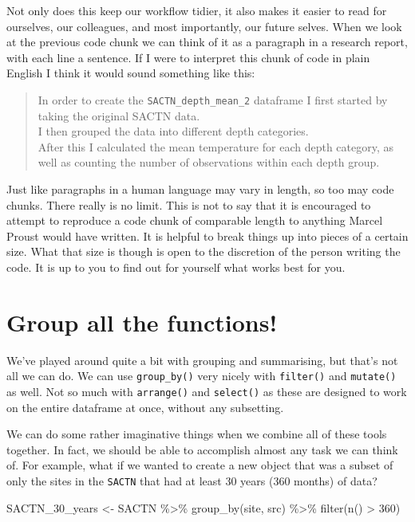 \documentclass[
]{book}
\newenvironment{Shaded}{\begin{snugshade}}{\end{snugshade}}
\newcommand{\DecValTok}[1]{\textcolor[rgb]{0.00,0.00,0.81}{#1}}
\newcommand{\FunctionTok}[1]{\textcolor[rgb]{0.00,0.00,0.00}{#1}}
\newcommand{\NormalTok}[1]{#1}
\newcommand{\OtherTok}[1]{\textcolor[rgb]{0.56,0.35,0.01}{#1}}
\newcommand{\SpecialCharTok}[1]{\textcolor[rgb]{0.00,0.00,0.00}{#1}}
\begin{document}
Not only does this keep our workflow tidier, it also makes it easier to read for ourselves, our colleagues, and most importantly, our future selves. When we look at the previous code chunk we can think of it as a paragraph in a research report, with each line a sentence. If I were to interpret this chunk of code in plain English I think it would sound something like this:

\begin{quote}
In order to create the \texttt{SACTN\_depth\_mean\_2} dataframe I first started by taking the original SACTN data.\\
I then grouped the data into different depth categories.\\
After this I calculated the mean temperature for each depth category, as well as counting the number of observations within each depth group.
\end{quote}

Just like paragraphs in a human language may vary in length, so too may code chunks. There really is no limit. This is not to say that it is encouraged to attempt to reproduce a code chunk of comparable length to anything Marcel Proust would have written. It is helpful to break things up into pieces of a certain size. What that size is though is open to the discretion of the person writing the code. It is up to you to find out for yourself what works best for you.

\hypertarget{group-all-the-functions}{%
\section{Group all the functions!}\label{group-all-the-functions}}

We've played around quite a bit with grouping and summarising, but that's not all we can do. We can use \texttt{group\_by()} very nicely with \texttt{filter()} and \texttt{mutate()} as well. Not so much with \texttt{arrange()} and \texttt{select()} as these are designed to work on the entire dataframe at once, without any subsetting.

We can do some rather imaginative things when we combine all of these tools together. In fact, we should be able to accomplish almost any task we can think of. For example, what if we wanted to create a new object that was a subset of only the sites in the \texttt{SACTN} that had at least 30 years (360 months) of data?

\begin{Shaded}
\begin{Highlighting}[]
\NormalTok{SACTN\_30\_years }\OtherTok{\textless{}{-}}\NormalTok{ SACTN }\SpecialCharTok{\%\textgreater{}\%}
  \FunctionTok{group\_by}\NormalTok{(site, src) }\SpecialCharTok{\%\textgreater{}\%}
  \FunctionTok{filter}\NormalTok{(}\FunctionTok{n}\NormalTok{() }\SpecialCharTok{\textgreater{}} \DecValTok{360}\NormalTok{)}
\end{Highlighting}
\end{Shaded}
\end{document}

